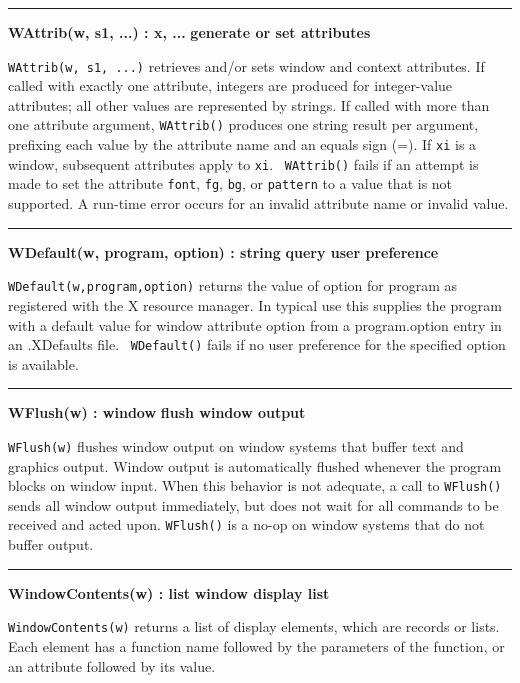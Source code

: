 \bigskip\hrule\vspace{0.1cm}
\noindent
{\bf WAttrib(w, s1, ...) : x, ... } \hfill {\bf generate or set attributes}

\noindent
\texttt{WAttrib(w, s1, ...)} retrieves and/or sets window and context
attributes. If called with exactly one attribute, integers are produced
for integer-value attributes; all other values are represented by
strings. If called with more than one attribute argument,
\texttt{WAttrib()} produces one string result per argument, prefixing
each value by the attribute name and an equals sign (=). If
\texttt{xi} is a window, subsequent attributes apply to \texttt{xi}.
\ \texttt{WAttrib()} fails if an attempt is made to set the attribute
\texttt{font}, \texttt{fg}, \texttt{bg}, or \texttt{pattern} to a value
that is not supported. A run-time error occurs for an invalid attribute
name or invalid value.

\bigskip\hrule\vspace{0.1cm}
\noindent
{\bf WDefault(w, program, option) : string } \hfill {\bf query user preference}

\noindent
\texttt{WDefault(w,program,option)} returns the value of option for
program as registered with the X resource manager. In typical use this
supplies the program with a default value for window attribute option
from a program.option entry in an .XDefaults file.
\ \texttt{WDefault()} fails if no user preference for the specified
option is available.

\bigskip\hrule\vspace{0.1cm}
\noindent
{\bf WFlush(w) : window } \hfill {\bf flush window output}

\noindent
\texttt{WFlush(w)} flushes window output on window systems that buffer
text and graphics output. Window output is automatically flushed
whenever the program blocks on window input. When this behavior is
not adequate, a call to \texttt{WFlush()} sends all window output
immediately, but does not wait for all commands to be received and
acted upon. \texttt{WFlush()} is a no-op on window systems that do not
buffer output.

\bigskip\hrule\vspace{0.1cm}
\noindent
{\bf WindowContents(w) : list } \hfill {\bf window display list}

\noindent
\texttt{WindowContents(w)} returns a list of display elements, which are
records or lists. Each element has a function name followed by the
parameters of the function, or an attribute followed by its value.


